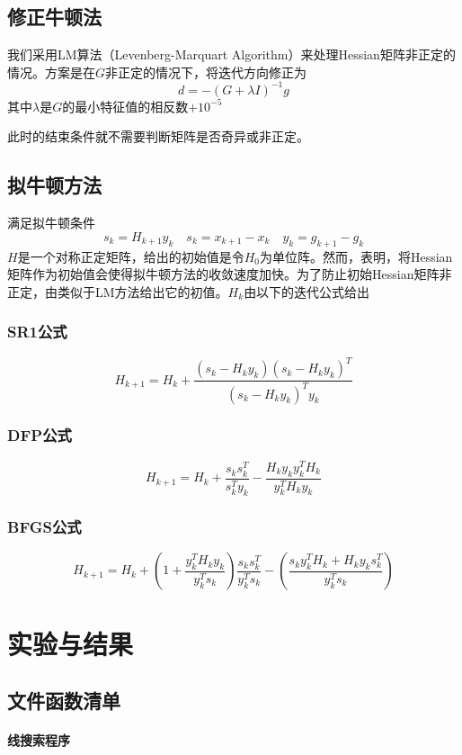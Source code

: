 \documentclass[11pt, a4paper]{article}
\begin{document}
\subsection{修正牛顿法}

我们采用LM算法（Levenberg-Marquart Algorithm\cite{more1978levenberg}\cite{ranganathan2004levenberg}）来处理Hessian矩阵非正定的情况。方案是在$G$非正定的情况下，将迭代方向修正为\[d=-(G+\lambda I)^{-1}g\]其中$\lambda$是$G$的最小特征值的相反数$+10^{-5}$

此时的结束条件就不需要判断矩阵是否奇异或非正定。

\subsection{拟牛顿方法}

满足拟牛顿条件\[s_k=H_{k+1}y_k\quad s_k=x_{k+1}-x_k\quad y_k=g_{k+1}-g_k\]$H$是一个对称正定矩阵，\cite{高立2014数}给出的初始值是令$H_0$为单位阵。然而，\cite{conn1991convergence}表明，将Hessian矩阵作为初始值会使得拟牛顿方法的收敛速度加快。为了防止初始Hessian矩阵非正定，由类似于LM方法给出它的初值。$H_k$由以下的迭代公式给出

\subsubsection{SR1公式}
\[H_{k+1}=H_k+\frac{(s_k-H_ky_k)(s_k-H_ky_k)^T}{(s_k-H_ky_k)^Ty_k}\]

\subsubsection{DFP公式}
\[H_{k+1}=H_k+\frac{s_ks_k^T}{s_k^Ty_k}-\frac{H_ky_ky_k^TH_k}{y_k^TH_ky_k}\]

\subsubsection{BFGS公式}
\[H_{k+1}=H_k+\left(1+\frac{y_k^TH_ky_k}{y_k^Ts_k}\right)\frac{s_ks_k^T}{y_k^Ts_k}-\left(\frac{s_ky_k^TH_k+H_ky_ks_k^T}{y_k^Ts_k}\right)\]

\section{实验与结果}
\subsection{文件函数清单}

\paragraph{线搜索程序}
\end{document}
